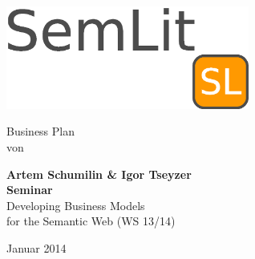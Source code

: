 \documentclass[12pt, a4paper]{article} %
\begin{document}
\thispagestyle{empty}

\begin{titlepage}
\begin{center}

\hbox{}
\vskip 1.8cm

\includegraphics[width=0.6\textwidth]{./logo}~

\hbox{}
\vfill
\vskip 1cm
Business Plan\\
von\\[2mm]
\vskip 1cm

{\large\bfseries Artem Schumilin \& Igor Tseyzer\\}
\vskip 4cm
{\bfseries Seminar}\\
Developing Business Models \\
for the Semantic Web (WS 13/14) \\
\vskip 2cm

\vskip 1cm
Januar 2014

\end{center}
\vfill
\end{titlepage}


\tableofcontents
\newpage



\newpage


\newpage


\newpage


\newpage

%


\newpage


\newpage
\end{document}
